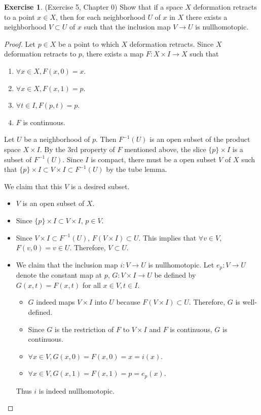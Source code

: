 \documentclass[12pt, psamsfonts]{amsart}
\theoremstyle{definition}
\newtheorem{exer}[thm]{Exercise}
\theoremstyle{remark}
\numberwithin{equation}{section}
\begin{document}
\begin{exer}{(Exercise 5, Chapter 0)}
  Show that if a space $X$ deformation retracts to a point $x \in X$, then for each neighborhood $U$ of $x$ in $X$ there exists a neighborhood $V \subset U$ of $x$ such that the inclusion map $V \rightarrow U$ is nullhomotopic.
\end{exer}

\begin{proof}
  Let $p \in X$ be a point to which $X$ deformation retracts.
  Since $X$ deformation retracts to $p$, there exists a map $F: X \times I \rightarrow X$ such that

  \begin{enumerate}
    \item
      $\forall x \in X, F(x, 0) = x$.
    \item
      $\forall x \in X, F(x, 1) = p$.
    \item
      $\forall t \in I, F(p, t) = p$.
    \item
      $F$ is continuous.
  \end{enumerate}
  Let $U$ be a neighborhood of $p$.
  Then $F^{-1}(U)$ is an open subset of the product space $X \times I$.
  By the 3rd property of $F$ mentioned above, the slice $\{ p \} \times I$ is a subset of $F^{-1}(U)$.
  Since $I$ is compact, there must be a open subset $V$ of $X$ such that $\{ p \} \times I \subset V \times I \subset F^{-1}(U)$ by the tube lemma.

  We claim that this $V$ is a desired subset.

  \begin{itemize}
    \item
      $V$ is an open subset of $X$.
    \item
      Since $\{ p \} \times I \subset V \times I$, $p \in V$.
    \item
      Since $V \times I \subset F^{-1}(U)$, $F(V \times I) \subset U$.
      This implies that $\forall v \in V$, $F(v, 0) = v \in U$.
      Therefore, $V \subset U$.
    \item
      We claim that the inclusion map $i: V \rightarrow U$ is nullhomotopic.
      Let $e_p:V \rightarrow U$ denote the constant map at $p$, $G: V \times I \rightarrow U$ be defined by $G(x, t) = F(x, t)$ for all $x \in V, t \in I$.
      \begin{itemize}
        \item
          $G$ indeed maps $V \times I$ into $U$ because $F(V \times I) \subset U$.
          Therefore, $G$ is well-defined.
        \item
          Since $G$ is the restriction of $F$ to $V \times I$ and $F$ is continuous, $G$ is continuous.
        \item
          $\forall x \in V, G(x, 0) = F(x, 0) = x = i(x)$.
        \item
          $\forall x \in V, G(x, 1) = F(x, 1) = p = e_p(x)$.
      \end{itemize}
      Thus $i$ is indeed nullhomotopic.
  \end{itemize}
\end{proof}
\end{document}
